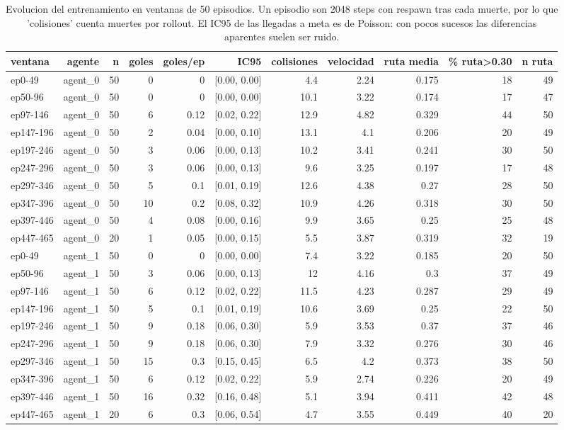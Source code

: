 \begin{table}[htbp]
  \centering
  \begin{tabular}{lrrrrrrrrrr}
    \toprule
    ventana & agente & n & goles & goles/ep & IC95 & colisiones & velocidad & ruta media & \% ruta>0.30 & n ruta \\
    \midrule
    ep0-49 & agent\_0 & 50 & 0 & 0 & [0.00, 0.00] & 4.4 & 2.24 & 0.175 & 18 & 49 \\
    ep50-96 & agent\_0 & 50 & 0 & 0 & [0.00, 0.00] & 10.1 & 3.22 & 0.174 & 17 & 47 \\
    ep97-146 & agent\_0 & 50 & 6 & 0.12 & [0.02, 0.22] & 12.9 & 4.82 & 0.329 & 44 & 50 \\
    ep147-196 & agent\_0 & 50 & 2 & 0.04 & [0.00, 0.10] & 13.1 & 4.1 & 0.206 & 20 & 49 \\
    ep197-246 & agent\_0 & 50 & 3 & 0.06 & [0.00, 0.13] & 10.2 & 3.41 & 0.241 & 30 & 50 \\
    ep247-296 & agent\_0 & 50 & 3 & 0.06 & [0.00, 0.13] & 9.6 & 3.25 & 0.197 & 17 & 48 \\
    ep297-346 & agent\_0 & 50 & 5 & 0.1 & [0.01, 0.19] & 12.6 & 4.38 & 0.27 & 28 & 50 \\
    ep347-396 & agent\_0 & 50 & 10 & 0.2 & [0.08, 0.32] & 10.9 & 4.26 & 0.318 & 30 & 50 \\
    ep397-446 & agent\_0 & 50 & 4 & 0.08 & [0.00, 0.16] & 9.9 & 3.65 & 0.25 & 25 & 48 \\
    ep447-465 & agent\_0 & 20 & 1 & 0.05 & [0.00, 0.15] & 5.5 & 3.87 & 0.319 & 32 & 19 \\
    ep0-49 & agent\_1 & 50 & 0 & 0 & [0.00, 0.00] & 7.4 & 3.22 & 0.185 & 20 & 50 \\
    ep50-96 & agent\_1 & 50 & 3 & 0.06 & [0.00, 0.13] & 12 & 4.16 & 0.3 & 37 & 49 \\
    ep97-146 & agent\_1 & 50 & 6 & 0.12 & [0.02, 0.22] & 11.5 & 4.23 & 0.287 & 29 & 49 \\
    ep147-196 & agent\_1 & 50 & 5 & 0.1 & [0.01, 0.19] & 10.6 & 3.69 & 0.25 & 22 & 50 \\
    ep197-246 & agent\_1 & 50 & 9 & 0.18 & [0.06, 0.30] & 5.9 & 3.53 & 0.37 & 37 & 46 \\
    ep247-296 & agent\_1 & 50 & 9 & 0.18 & [0.06, 0.30] & 7.9 & 3.32 & 0.276 & 30 & 46 \\
    ep297-346 & agent\_1 & 50 & 15 & 0.3 & [0.15, 0.45] & 6.5 & 4.2 & 0.373 & 38 & 50 \\
    ep347-396 & agent\_1 & 50 & 6 & 0.12 & [0.02, 0.22] & 5.9 & 2.74 & 0.226 & 20 & 49 \\
    ep397-446 & agent\_1 & 50 & 16 & 0.32 & [0.16, 0.48] & 5.1 & 3.94 & 0.411 & 42 & 48 \\
    ep447-465 & agent\_1 & 20 & 6 & 0.3 & [0.06, 0.54] & 4.7 & 3.55 & 0.449 & 40 & 20 \\
    \bottomrule
  \end{tabular}
  \caption{Evolucion del entrenamiento en ventanas de 50 episodios. Un episodio son 2048 steps con respawn tras cada muerte, por lo que 'colisiones' cuenta muertes por rollout. El IC95 de las llegadas a meta es de Poisson: con pocos sucesos las diferencias aparentes suelen ser ruido.}
  \label{tab:entrenamiento_ventanas}
\end{table}
